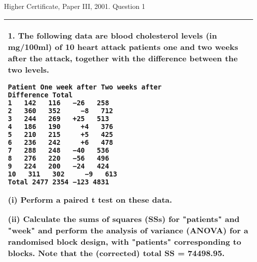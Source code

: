 \documentclass[a4paper,12pt]{article}
\begin{document}

Higher Certificate, Paper III, 2001. Question 1

\begin{table}[ht!]
     


\centering
     


\begin{tabular}{|p{15cm}|}
     


\hline 


1. The following data are blood cholesterol levels (in mg/100ml) of 10 heart attack patients one and two weeks after the attack, together with the difference between the two levels. 

\begin{verbatim} 
Patient One week after Two weeks after 
Difference Total 
1   142   116   −26   258 
2   360   352     −8   712 
3   244   269   +25   513 
4   186   190     +4   376 
5   210   215     +5   425 
6   236   242     +6   478 
7   288   248   −40   536 
8   276   220   −56   496 
9   224   200   −24   424 
10   311   302     −9   613 
Total 2477 2354 −123 4831 
\end{verbatim} 
 
(i) Perform a paired t test on these data. 
 
 
(ii) Calculate the sums of squares (SSs) for "patients" and "week" and perform the analysis of variance (ANOVA) for a randomised block design, with "patients" corresponding to blocks.  Note that the (corrected) total SS = 74498.95.  
\\ \hline
\end{tabular}
\end{table}





\end{document}

